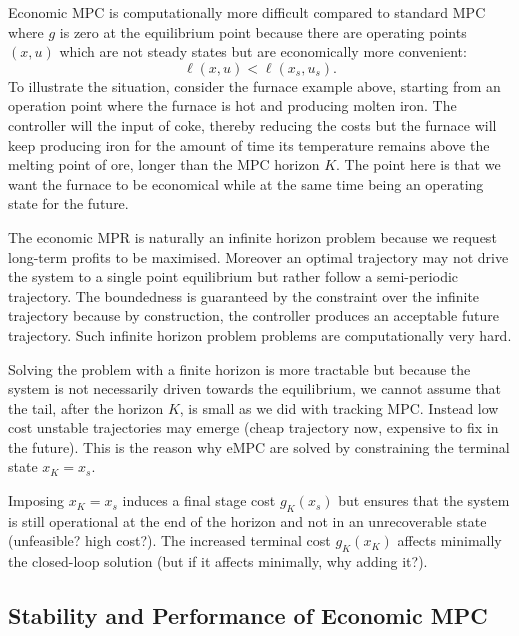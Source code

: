 Economic MPC is computationally more difficult compared to standard MPC where $g$ is zero at the equilibrium point because there are operating points $(x,u)$ which are not steady states but are economically more convenient:
\begin{equation*}
  \ell(x,u) < \ell(x_s,u_s).
\end{equation*}
To illustrate the situation, consider the furnace example above, starting from an operation point where the furnace is hot and producing molten iron. The controller will the input of coke, thereby reducing the costs but the furnace will keep producing iron for the amount of time its temperature remains above the melting point of ore, longer than the MPC horizon $K$. The point here is that we want the furnace to be economical while at the same time being an operating state for the future.

The economic MPR is naturally an infinite horizon problem because we request long-term profits to be maximised. Moreover an optimal trajectory may not drive the system to a single point equilibrium but rather follow a semi-periodic trajectory. The boundedness is guaranteed by the constraint over the infinite trajectory because by construction, the controller produces an acceptable future trajectory. Such infinite horizon problem problems are computationally very hard.

Solving the problem with a finite horizon is more tractable but because the system is not necessarily driven towards the equilibrium, we cannot assume that the tail, after the horizon $K$, is small as we did with tracking MPC. Instead low cost unstable trajectories may emerge (cheap trajectory now, expensive to fix in the future). This is the reason why eMPC are solved by constraining the terminal state $x_K=x_s$.

Imposing $x_K=x_s$ induces a final stage cost $g_K(x_s)$ but ensures that the system is still operational at the end of the horizon and not in an unrecoverable state (unfeasible? high cost?). The increased terminal cost $g_K(x_K)$ affects minimally the closed-loop solution (but if it affects minimally, why adding it?).

\subsection{Stability and Performance of Economic MPC}
\label{sec:stability-performance-economic-MPC}

